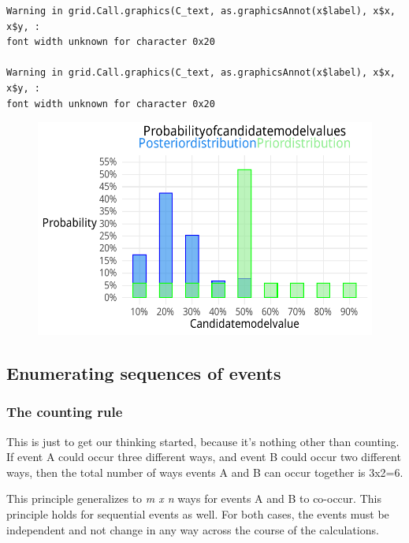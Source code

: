 \documentclass[
  letterpaper,
  DIV=11,
  numbers=noendperiod,
  oneside]{scrartcl}
\begin{document}
\begin{verbatim}
Warning in grid.Call.graphics(C_text, as.graphicsAnnot(x$label), x$x, x$y, :
font width unknown for character 0x20

Warning in grid.Call.graphics(C_text, as.graphicsAnnot(x$label), x$x, x$y, :
font width unknown for character 0x20
\end{verbatim}

\begin{figure}[H]

{\centering \includegraphics{rethinking2024wk1_files/figure-pdf/unnamed-chunk-12-1.pdf}

}

\end{figure}

\hypertarget{enumerating-sequences-of-events}{%
\subsection{Enumerating sequences of
events}\label{enumerating-sequences-of-events}}

\hypertarget{the-counting-rule}{%
\subsubsection{The counting rule}\label{the-counting-rule}}

This is just to get our thinking started, because it's nothing other
than counting. If event A could occur three different ways, and event B
could occur two different ways, then the total number of ways events A
and B can occur together is 3x2=6.

This principle generalizes to \emph{m x n} ways for events A and B to
co-occur. This principle holds for sequential events as well. For both
cases, the events must be independent and not change in any way across
the course of the calculations.
\end{document}
